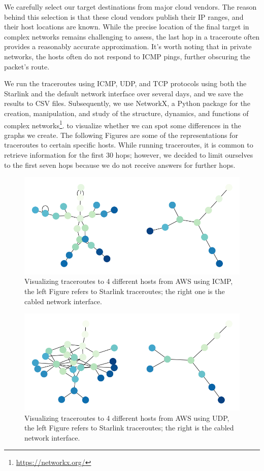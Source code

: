 \documentclass[IN,11pt,twoside,openright,idp,english]{tumthesis}
\begin{document}
We carefully select our target destinations from major cloud vendors. The reason behind this selection is that these
cloud vendors publish their IP ranges, and their host locations are known. While the precise location of the final
target in complex networks remains challenging to assess, the last hop in a traceroute often provides a reasonably
accurate approximation. It's worth noting that in private networks, the hosts often do not respond to ICMP pings,
further obscuring the packet's route.

We run the traceroutes using ICMP, UDP, and TCP protocols using both the Starlink and the default network interface over
several days, and we save the results to CSV files. Subsequently, we use NetworkX, a Python package for the creation,
manipulation, and study of the structure, dynamics, and functions of complex
networks\footnote{\url{https://networkx.org/}}. to visualize whether we can spot some differences in the graphs we
create. The following Figures are some of the representations for traceroutes to certain specific hosts. While running
traceroutes, it is common to retrieve information for the first 30 hops; however, we decided to limit ourselves to the
first seven hops because we do not receive answers for further hops. 

\begin{figure}
    \label{fig:tr_aws_icmp}
    \centering
    \includegraphics[width=0.6\columnwidth]{img/tr_aws_icmp.png}
    \caption{Visualizing traceroutes to 4 different hosts from AWS using ICMP, the left Figure refers to Starlink traceroutes; the right one is the cabled network interface.}
\end{figure}
    
\begin{figure}
    \label{fig:tr_aws_udp}
    \centering
    \includegraphics[width=0.6\columnwidth]{img/tr_aws_udp.png}
    \caption{Visualizing traceroutes to 4 different hosts from AWS using UDP, the left Figure refers to Starlink traceroutes; the right is the cabled network interface.}
\end{figure}
    
\end{document}

